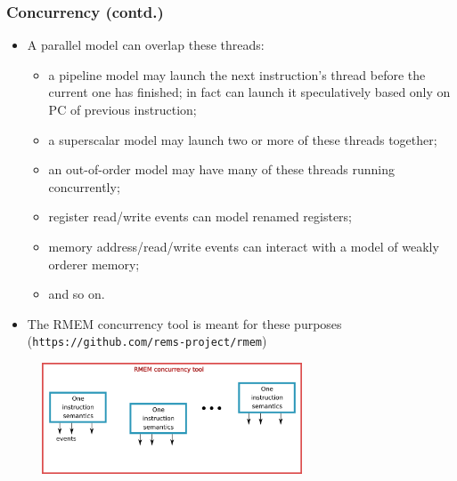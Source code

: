\documentclass[aspectratio=169]{beamer}
\newcommand{\slidefont}{\scriptsize}
\begin{document}

\begin{frame}[fragile]
  \frametitle{Concurrency (contd.)}

  \slidefont

  \begin{itemize}

  \item
    A parallel model can overlap these threads:
    \begin{itemize}\slidefont
    \item a pipeline model may launch the next instruction's thread before the current one has
      finished; in fact can launch it speculatively based only on PC of previous instruction;
    \item a superscalar model may launch two or more of these threads together;
    \item an out-of-order model may have many of these threads running concurrently;
    \item register read/write events can model renamed registers;
    \item memory address/read/write events can interact with a model of weakly orderer memory;
    \item and so on.
    \end{itemize}

  \item The RMEM concurrency tool is meant for these purposes ({\tt https://github.com/rems-project/rmem})
  \end{itemize}

  \vfill

  \begin{figure}[htbp]
    \centerline{\includegraphics[height=1.3in]{Figures/Fig_concurrency.png}}
  \end{figure}

\end{frame}

\end{document}
